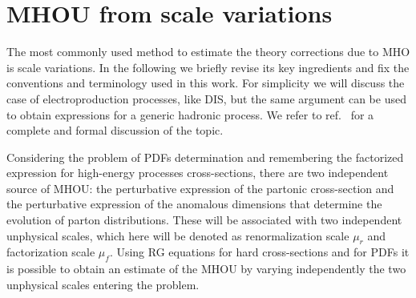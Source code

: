 \section{MHOU from scale variations}
\label{sec:scale_var}
The most commonly used method to estimate the theory corrections due to MHO is scale variations. 
In the following we briefly revise its key ingredients and fix the conventions and terminology used in this work.
For simplicity we will discuss the case of electroproduction processes, like DIS, but the same argument
can be used to obtain expressions for a generic hadronic process. 
We refer to ref.~\cite{AbdulKhalek:2019ihb} for a complete and formal discussion of the topic.

%
Considering the problem of PDFs determination and remembering the factorized expression
for high-energy processes cross-sections, there are two independent source of MHOU: the 
perturbative expression of the partonic cross-section and the perturbative expression of the 
anomalous dimensions that determine the evolution of parton distributions.
These will be associated with two independent unphysical scales, which here will be denoted as renormalization scale
$\mu_r$ and factorization scale $\mu_f$.
Using RG equations for hard cross-sections and for PDFs it is possible to obtain an estimate of the MHOU
by varying independently the two unphysical scales entering the problem.

